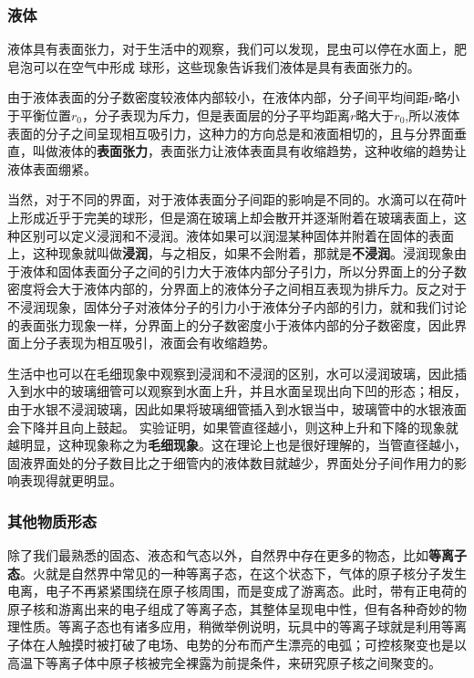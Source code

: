 \subsubsection{液体}
液体具有表面张力，对于生活中的观察，我们可以发现，昆虫可以停在水面上，肥皂泡可以在空气中形成 球形，这些现象告诉我们液体是具有表面张力的。

由于液体表面的分子数密度较液体内部较小，在液体内部，分子间平均间距$r$略小于平衡位置$r_0$，分子表现为斥力，但是表面层的分子平均距离$r$略大于$r_0$,所以液体表面的分子之间呈现相互吸引力，这种力的方向总是和液面相切的，且与分界面垂直，叫做液体的\textbf{表面张力}，表面张力让液体表面具有收缩趋势，这种收缩的趋势让液体表面绷紧。

当然，对于不同的界面，对于液体表面分子间距的影响是不同的。水滴可以在荷叶上形成近乎于完美的球形，但是滴在玻璃上却会散开并逐渐附着在玻璃表面上，这种区别可以定义浸润和不浸润。液体如果可以润湿某种固体并附着在固体的表面上，这种现象就叫做\textbf{浸润}，与之相反，如果不会附着，那就是\textbf{不浸润}。浸润现象由于液体和固体表面分子之间的引力大于液体内部分子引力，所以分界面上的分子数密度将会大于液体内部的，分界面上的液体分子之间相互表现为排斥力。反之对于不浸润现象，固体分子对液体分子的引力小于液体分子内部的引力，就和我们讨论的表面张力现象一样，分界面上的分子数密度小于液体内部的分子数密度，因此界面上分子表现为相互吸引，液面会有收缩趋势。

生活中也可以在毛细现象中观察到浸润和不浸润的区别，水可以浸润玻璃，因此插入到水中的玻璃细管可以观察到水面上升，并且水面呈现出向下凹的形态；相反，由于水银不浸润玻璃，因此如果将玻璃细管插入到水银当中，玻璃管中的水银液面会下降并且向上鼓起。%
实验证明，如果管直径越小，则这种上升和下降的现象就越明显，这种现象称之为\textbf{毛细现象}。这在理论上也是很好理解的，当管直径越小，固液界面处的分子数目比之于细管内的液体数目就越少，界面处分子间作用力的影响表现得就更明显。

\subsubsection{其他物质形态}
除了我们最熟悉的固态、液态和气态以外，自然界中存在更多的物态，比如\textbf{等离子态}。火就是自然界中常见的一种等离子态，在这个状态下，气体的原子核分子发生电离，电子不再紧紧围绕在原子核周围，而是变成了游离态。此时，带有正电荷的原子核和游离出来的电子组成了等离子态，其整体呈现电中性，但有各种奇妙的物理性质。等离子态也有诸多应用，稍微举例说明，玩具中的等离子球就是利用等离子体在人触摸时被打破了电场、电势的分布而产生漂亮的电弧；可控核聚变也是以高温下等离子体中原子核被完全裸露为前提条件，来研究原子核之间聚变的。

